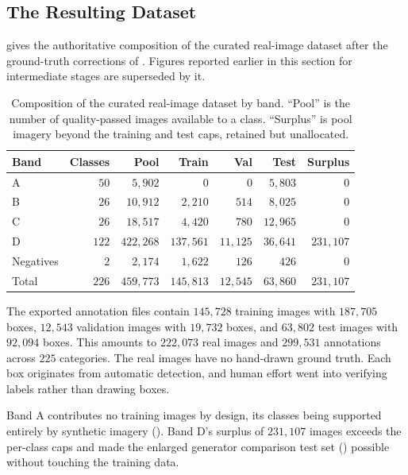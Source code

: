 \subsection{The Resulting Dataset}\label{sec:final_dataset_composition}

 gives the authoritative composition of the curated real-image dataset after the ground-truth corrections of . Figures reported earlier in this section for intermediate stages are superseded by it.

\begin{table}[htbp]
\centering
\caption[Composition of the curated real-image dataset by band]{Composition of the curated real-image dataset by band. \enquote{Pool} is the number of quality-passed images available to a class. \enquote{Surplus} is pool imagery beyond the training and test caps, retained but unallocated.}
\label{tab:final-real-composition}
\begin{tabular}{@{}lrrrrrr@{}}
\toprule
Band & Classes & Pool & Train & Val & Test & Surplus \\
\midrule
A & $50$ & $5{,}902$ & $0$ & $0$ & $5{,}803$ & $0$ \\
B & $26$ & $10{,}912$ & $2{,}210$ & $514$ & $8{,}025$ & $0$ \\
C & $26$ & $18{,}517$ & $4{,}420$ & $780$ & $12{,}965$ & $0$ \\
D & $122$ & $422{,}268$ & $137{,}561$ & $11{,}125$ & $36{,}641$ & $231{,}107$ \\
Negatives & $2$ & $2{,}174$ & $1{,}622$ & $126$ & $426$ & $0$ \\
\midrule
Total & $226$ & $459{,}773$ & $145{,}813$ & $12{,}545$ & $63{,}860$ & $231{,}107$ \\
\bottomrule
\end{tabular}
\end{table}

The exported annotation files contain $145{,}728$ training images with $187{,}705$ boxes, $12{,}543$ validation images with $19{,}732$ boxes, and $63{,}802$ test images with $92{,}094$ boxes. This amounts to $222{,}073$ real images and $299{,}531$ annotations across $225$ categories. The real images have no hand-drawn ground truth. Each box originates from automatic detection, and human effort went into verifying labels rather than drawing boxes.

Band A contributes no training images by design, its classes being supported entirely by synthetic imagery (). Band D's surplus of $231{,}107$ images exceeds the per-class caps and made the enlarged generator comparison test set () possible without touching the training data.

